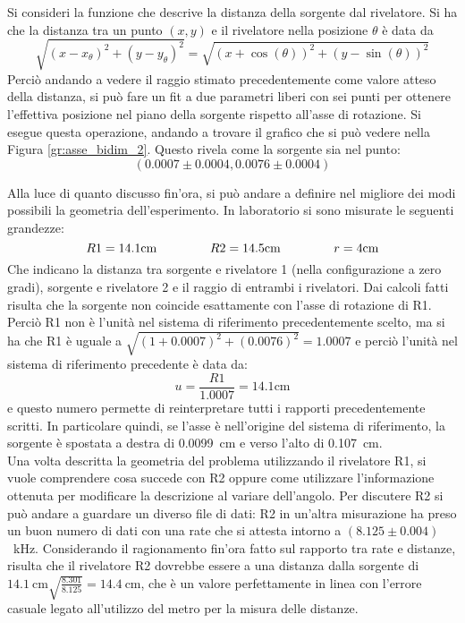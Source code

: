 Si consideri la funzione che descrive la distanza della
sorgente dal rivelatore. Si ha che la distanza tra un punto $(x,y)$ e il rivelatore nella posizione $\theta$ è data da
$$\sqrt{(x-x_\theta)^2+(y-y_\theta)^2} = \sqrt{(x+\cos(\theta))^2+(y-\sin(\theta))^2}$$
Perciò andando a vedere il raggio stimato precedentemente come valore atteso della distanza, si può fare un fit a due parametri liberi con sei punti per ottenere
l'effettiva posizione nel piano della sorgente rispetto all'asse di rotazione. Si esegue questa operazione, andando a trovare il grafico che si può vedere nella
Figura \ref{gr:asse_bidim_2}. Questo rivela come la sorgente sia nel punto:
$$(0.0007 \pm 0.0004, 0.0076 \pm 0.0004)$$


Alla luce di quanto discusso fin'ora, si può andare a definire nel migliore dei modi possibili la geometria dell'esperimento. In laboratorio si sono misurate le
seguenti grandezze:
$$R1 = 14.1 \text{cm} \hspace{1.5cm} R2 = 14.5 \text{cm} \hspace{1.5cm} r = 4 \text{cm}$$
Che indicano la distanza tra sorgente e rivelatore 1 (nella configurazione a zero gradi), sorgente e rivelatore 2 e il raggio di entrambi i rivelatori. Dai calcoli fatti
risulta che la sorgente non coincide esattamente con l'asse di rotazione di R1. Perciò R1 non è l'unità nel sistema di riferimento precedentemente scelto, ma si ha che R1
è uguale a $\sqrt{(1+0.0007)^2+(0.0076)^2} = 1.0007$
e perciò l'unità nel sistema di riferimento precedente è data da:
$$u =\frac{R1}{1.0007}=14.1 \text{cm}$$
e questo numero permette di reinterpretare tutti i rapporti precedentemente scritti. In particolare quindi, se l'asse è nell'origine del sistema di riferimento, la
sorgente è spostata a destra di 0.0099~cm e verso l'alto di 0.107~cm.\\

Una volta descritta la geometria del problema utilizzando il rivelatore R1, si vuole comprendere cosa succede con R2 oppure come utilizzare l'informazione ottenuta per
modificare la descrizione al variare dell'angolo. Per discutere R2 si può andare a guardare un diverso file di dati: R2 in un'altra misurazione ha preso un buon numero
di dati con una rate che si attesta intorno a $(8.125 \pm 0.004)$~kHz. Considerando il ragionamento fin'ora fatto sul rapporto tra rate e distanze, risulta che il
rivelatore R2 dovrebbe essere a una distanza dalla sorgente di $14.1~\text{cm} \sqrt{\frac{8.301}{8.125}} = 14.4~\text{cm}$, che è un valore perfettamente in linea con
l'errore casuale legato all'utilizzo del metro per la misura delle distanze.\\

